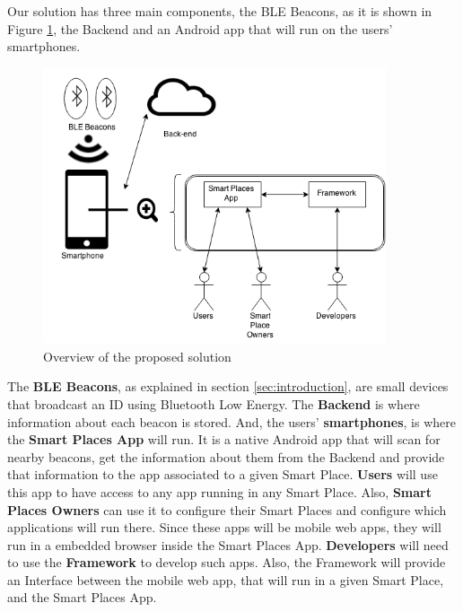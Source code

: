 Our solution has three main components,
the BLE Beacons, as it is shown in Figure 
\ref{fig:overview_architecture}, 
the Backend and an Android app
that will run on the users' smartphones.
\begin{figure}[!ht]
  \centering
    \includegraphics[width=0.9\textwidth]{img/overview_architecture}
    \caption{Overview of the proposed solution}
    \label{fig:overview_architecture}
\end{figure}
The \textbf{BLE Beacons}, as explained in section 
\ref{sec:introduction}, are small devices that broadcast
an ID using Bluetooth Low Energy. The \textbf{Backend} is where information about each beacon is stored. 
And, the users'
\textbf{smartphones}, is where the 
\textbf{Smart Places App} will run.
It is a native Android app that will scan for 
nearby beacons,
get the information about them from the Backend and
provide that information to the app associated to a 
given Smart Place.
\textbf{Users} will use this app to have access
to any app running in any Smart Place.
Also, \textbf{Smart Places Owners} can use it to configure
their Smart Places and configure which applications
will run there.
Since these apps will be mobile web apps, they will run
in a embedded browser inside the Smart Places App.
\textbf{Developers} will need to use the \textbf{Framework} to
develop such apps. Also, the Framework will provide an
Interface between the mobile web app, that will run
in a given Smart Place, and the Smart Places App.


